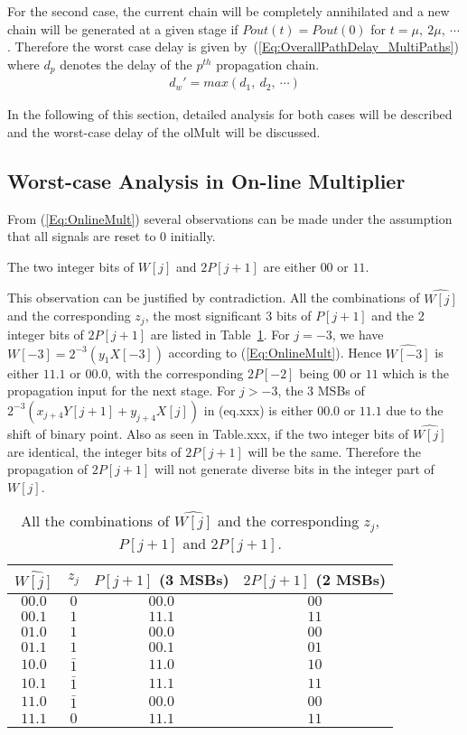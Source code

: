 \documentclass[a4paper, 11pt]{article}
\newtheorem{Ob}{\hskip\parindent\bf{Observation}}[]
\begin{document}
For the second case, the current chain will be completely annihilated and a new chain will be generated at a given stage if $Pout(t)=Pout(0)$ for $t=\mu,~2\mu,~\cdots$. Therefore the worst case delay is given by~(\ref{Eq:OverallPathDelay_MultiPaths}) where $d_p$ denotes the delay of the $p^{th}$ propagation chain.
\begin{eqnarray}\label{Eq:OverallPathDelay_MultiPaths}
  d_w'=max(d_1,~d_2,~\cdots)
\end{eqnarray}

In the following of this section, detailed analysis for both cases will be described and the worst-case delay of the olMult will be discussed.
\subsection{Worst-case Analysis in On-line Multiplier}
From (\ref{Eq:OnlineMult}) several observations can be made under the assumption that all signals are reset to $0$ initially. 

\begin{Ob}\label{Ob:Ob1}
    The two integer bits of $W[j]$ and $2P[j+1]$ are either $00$ or $11$.
\end{Ob}

This observation can be justified by contradiction. All the combinations of $\widehat{W[j]}$ and the corresponding $z_j$, the most significant 3 bits of $P[j+1]$ and the 2 integer bits of $2P[j+1]$ are listed in Table~\ref{Tab:Observation1}. For $j=-3$, we have $W[-3]=2^{-3}(y_1X[-3])$ according to (\ref{Eq:OnlineMult}). Hence $\widehat{W[-3]}$ is either $11.1$ or $00.0$, with the corresponding $2P[-2]$ being $00$ or $11$ which is the propagation input for the next stage. For $j>-3$, the 3 MSBs of $2^{-3}(x_{j+4}Y[j+1]+y_{j+4}X[j])$ in (eq.xxx) is either $00.0$ or $11.1$ due to the shift of binary point. Also as seen in Table.xxx, if the two integer bits of $\widehat{W[j]}$ are identical, the integer bits of $2P[j+1]$ will be the same. Therefore the propagation of $2P[j+1]$ will not generate diverse bits in the integer part of $W[j]$.
%
\begin{table}[htbp]
\caption{All the combinations of $\widehat{W[j]}$ and the corresponding $z_j$, $P[j+1]$ and $2P[j+1]$.}
\centering
\begin{tabular}{c|ccc}
\toprule
 $\widehat{W[j]}$ & $z_j$ & $P[j+1]$ (3 MSBs)  & $2P[j+1]$ (2 MSBs) \\ \midrule
 $00.0$ & $0$ & $00.0$ & $00$\\
 $00.1$ & $1$ & $11.1$ & $11$\\
 $01.0$ & $1$ & $00.0$ & $00$\\
 $01.1$ & $1$ & $00.1$ & $01$\\
 $10.0$ & $\bar{1}$ & $11.0$ & $10$\\
 $10.1$ & $\bar{1}$ & $11.1$ & $11$\\
 $11.0$ & $\bar{1}$ & $00.0$ & $00$\\
 $11.1$ & $0$ & $11.1$ & $11$\\ \bottomrule
\end{tabular}
\label{Tab:Observation1}
\end{table}
\end{document}
